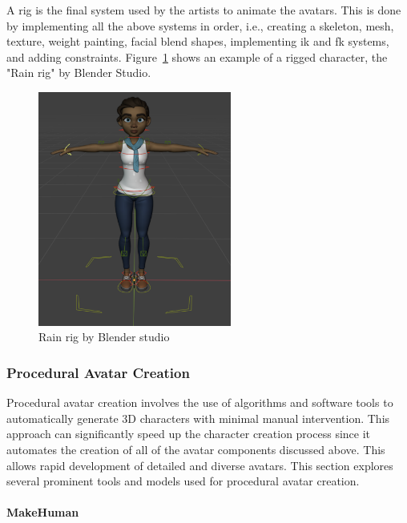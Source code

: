 \documentclass[../../main.tex]{subfiles}
\begin{document}
A rig is the final system used by the artists to animate the avatars. This is done by implementing all the above systems in order, i.e., creating a skeleton, mesh, texture, weight painting, facial blend shapes, implementing \gls{ik} and \gls{fk} systems, and adding constraints. Figure~\ref{fig:rig_example} shows an example of a rigged character, the "Rain rig" by Blender Studio.

\begin{figure} 
  \centering \includegraphics[width = 2.5in]{chapters/background_work/images/rig_example.png} 
  \caption{Rain rig by Blender studio} 
  \label{fig:rig_example} 
\end{figure}

\subsubsection{Procedural Avatar Creation}
\label{ch:background_work:sign_language_synthesis:3d_techniques:procedural_avatar_creation}

Procedural avatar creation involves the use of algorithms and software tools to automatically generate 3D characters with minimal manual intervention. This approach can significantly speed up the character creation process since it automates the creation of all of the avatar components discussed above. This allows rapid development of detailed and diverse avatars. This section explores several prominent tools and models used for procedural avatar creation.

\paragraph{MakeHuman}
\label{ch:background_work:sign_language_synthesis:3d_techniques:procedural_avatar_creation:makehuman}
\end{document}

